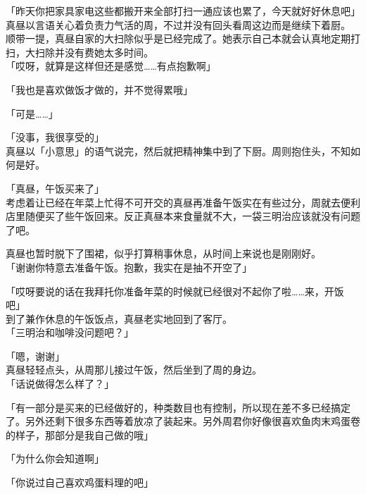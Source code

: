 「昨天你把家具家电这些都搬开来全部打扫一通应该也累了，今天就好好休息吧」\\

真昼以言语关心着负责力气活的周，不过并没有回头看周这边而是继续下着厨。\\

顺带一提，真昼自家的大扫除似乎是已经完成了。她表示自己本就会认真地定期打扫，大扫除并没有费她太多时间。\\

「哎呀，就算是这样但还是感觉……有点抱歉啊」

「我也是喜欢做饭才做的，并不觉得累哦」

「可是……」

「没事，我很享受的」\\

真昼以「小意思」的语气说完，然后就把精神集中到了下厨。周则抱住头，不知如何是好。\\

\vspace{2\baselineskip}

「真昼，午饭买来了」\\

考虑着让已经在年菜上忙得不可开交的真昼再准备午饭实在有些过分，周就去便利店里随便买了些午饭回来。反正真昼本来食量就不大，一袋三明治应该就没有问题了吧。

真昼也暂时脱下了围裙，似乎打算稍事休息，从时间上来说也是刚刚好。\\

「谢谢你特意去准备午饭。抱歉，我实在是抽不开空了」

「哎呀要说的话在我拜托你准备年菜的时候就已经很对不起你了啦……来，开饭吧」\\

到了兼作休息的午饭饭点，真昼老实地回到了客厅。\\

「三明治和咖啡没问题吧？」

「嗯，谢谢」\\

真昼轻轻点头，从周那儿接过午饭，然后坐到了周的身边。\\

「话说做得怎么样了？」

「有一部分是买来的已经做好的，种类数目也有控制，所以现在差不多已经搞定了。另外还剩下很多东西等着放凉了装起来。另外周君你好像很喜欢鱼肉末鸡蛋卷的样子，那部分是我自己做的哦」

「为什么你会知道啊」

「你说过自己喜欢鸡蛋料理的吧」\\

